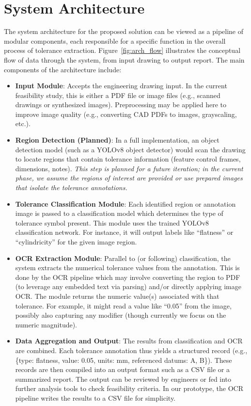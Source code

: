 \documentclass[11pt,a4paper]{article}
\begin{document}
\section{System Architecture}
The system architecture for the proposed solution can be viewed as a pipeline of modular components, each responsible for a specific function in the overall process of tolerance extraction. Figure~\ref{fig:arch_flow} illustrates the conceptual flow of data through the system, from input drawing to output report. The main components of the architecture include:

\begin{itemize}
  \item \textbf{Input Module}: Accepts the engineering drawing input. In the current feasibility study, this is either a PDF file or image files (e.g., scanned drawings or synthesized images). Preprocessing may be applied here to improve image quality (e.g., converting CAD PDFs to images, grayscaling, etc.).
  \item \textbf{Region Detection (Planned)}: In a full implementation, an object detection model (such as a YOLOv8 object detector) would scan the drawing to locate regions that contain tolerance information (feature control frames, dimensions, notes). \emph{This step is planned for a future iteration; in the current phase, we assume the regions of interest are provided or use prepared images that isolate the tolerance annotations.}
  \item \textbf{Tolerance Classification Module}: Each identified region or annotation image is passed to a classification model which determines the type of tolerance symbol present. This module uses the trained YOLOv8 classification network. For instance, it will output labels like “flatness” or “cylindricity” for the given image region.
  \item \textbf{OCR Extraction Module}: Parallel to (or following) classification, the system extracts the numerical tolerance values from the annotation. This is done by the OCR pipeline which may involve converting the region to PDF (to leverage any embedded text via parsing) and/or directly applying image OCR. The module returns the numeric value(s) associated with that tolerance. For example, it might read a value like “0.05” from the image, possibly also capturing any modifier (though currently we focus on the numeric magnitude).
  \item \textbf{Data Aggregation and Output}: The results from classification and OCR are combined. Each tolerance annotation thus yields a structured record (e.g., \{type: flatness, value: 0.05, units: mm, referenced datums: A, B\}). These records are then compiled into an output format such as a CSV file or a summarized report. The output can be reviewed by engineers or fed into further analysis tools to check feasibility criteria. In our prototype, the OCR pipeline writes the results to a CSV file for simplicity.
\end{itemize}
\end{document}
